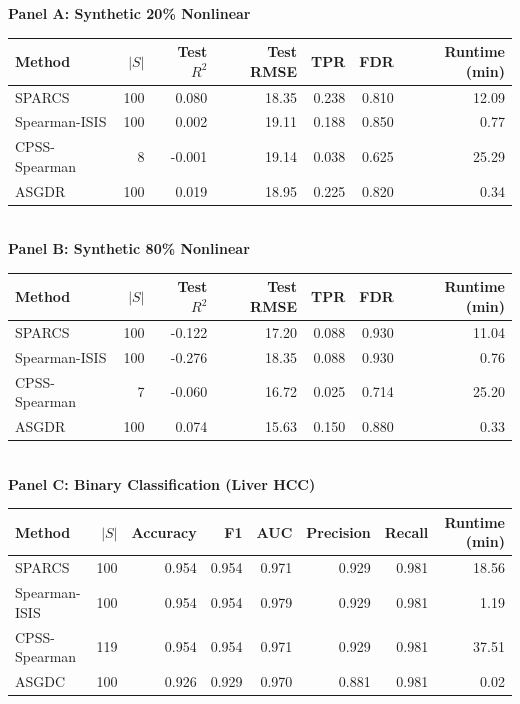 %
%

\textbf{Panel A: Synthetic 20\% Nonlinear}\\[2pt]
\begin{tabular}{lrrrrrr}
\toprule
Method & $|S|$ & Test $R^2$ & Test RMSE & TPR & FDR & Runtime (min) \\
\midrule
SPARCS & 100 & 0.080 & 18.35 & 0.238 & 0.810 & 12.09 \\
Spearman-ISIS & 100 & 0.002 & 19.11 & 0.188 & 0.850 & 0.77 \\
CPSS-Spearman & 8 & -0.001 & 19.14 & 0.038 & 0.625 & 25.29 \\
ASGDR & 100 & 0.019 & 18.95 & 0.225 & 0.820 & 0.34 \\
\bottomrule
\end{tabular}\\[10pt]

\textbf{Panel B: Synthetic 80\% Nonlinear}\\[2pt]
\begin{tabular}{lrrrrrr}
\toprule
Method & $|S|$ & Test $R^2$ & Test RMSE & TPR & FDR & Runtime (min) \\
\midrule
SPARCS & 100 & -0.122 & 17.20 & 0.088 & 0.930 & 11.04 \\
Spearman-ISIS & 100 & -0.276 & 18.35 & 0.088 & 0.930 & 0.76 \\
CPSS-Spearman & 7 & -0.060 & 16.72 & 0.025 & 0.714 & 25.20 \\
ASGDR & 100 & 0.074 & 15.63 & 0.150 & 0.880 & 0.33 \\
\bottomrule
\end{tabular}\\[10pt]

\textbf{Panel C: Binary Classification (Liver HCC)}\\[2pt]
\begin{tabular}{lrrrrrrr}
\toprule
Method & $|S|$ & Accuracy & F1 & AUC & Precision & Recall & Runtime (min) \\
\midrule
SPARCS & 100 & 0.954 & 0.954 & 0.971 & 0.929 & 0.981 & 18.56 \\
Spearman-ISIS & 100 & 0.954 & 0.954 & 0.979 & 0.929 & 0.981 & 1.19 \\
CPSS-Spearman & 119 & 0.954 & 0.954 & 0.971 & 0.929 & 0.981 & 37.51 \\
ASGDC & 100 & 0.926 & 0.929 & 0.970 & 0.881 & 0.981 & 0.02 \\
\bottomrule
\end{tabular}\\[10pt]

